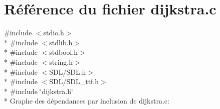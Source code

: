 \section{Référence du fichier dijkstra.\+c}
\label{dijkstra_8c}
{\ttfamily \#include $<$stdio.\+h$>$}\\*
{\ttfamily \#include $<$stdlib.\+h$>$}\\*
{\ttfamily \#include $<$stdbool.\+h$>$}\\*
{\ttfamily \#include $<$string.\+h$>$}\\*
{\ttfamily \#include $<$S\+D\+L/\+S\+D\+L.\+h$>$}\\*
{\ttfamily \#include $<$S\+D\+L/\+S\+D\+L\+\_\+ttf.\+h$>$}\\*
{\ttfamily \#include \char`\"{}dijkstra.\+h\char`\"{}}\\*
Graphe des dépendances par inclusion de dijkstra.\+c\+:

